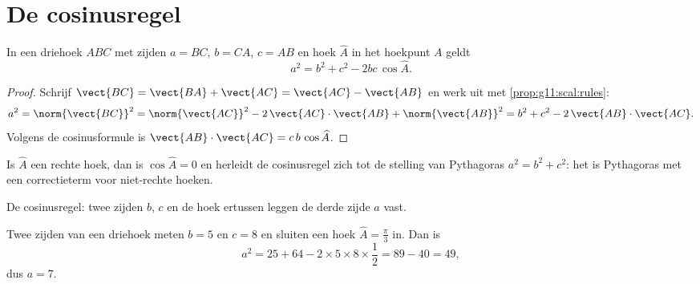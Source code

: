 \section{De cosinusregel}

\begin{theorem}[Cosinusregel]\label{thm:g11:scal:cosines}
In een driehoek $ABC$ met zijden $a = BC$, $b = CA$, $c = AB$ en hoek
$\widehat A$ in het hoekpunt $A$ geldt
\[
a^2 = b^2 + c^2 - 2bc\,\cos\widehat A .
\]
\end{theorem}

\begin{proof}
Schrijf $\vect{BC} = \vect{BA} + \vect{AC} = \vect{AC} - \vect{AB}$ en werk
uit met \cref{prop:g11:scal:rules}:
\[
a^2 = \norm{\vect{BC}}^2
= \norm{\vect{AC}}^2 - 2\,\vect{AC}\cdot\vect{AB} + \norm{\vect{AB}}^2
= b^2 + c^2 - 2\,\vect{AB}\cdot\vect{AC}.
\]
Volgens de cosinusformule is $\vect{AB}\cdot\vect{AC} = c\,b\,\cos\widehat A$.
\end{proof}

\begin{remark}
Is $\widehat A$ een rechte hoek, dan is $\cos\widehat A = 0$ en herleidt de
cosinusregel zich tot de stelling van Pythagoras $a^2 = b^2 + c^2$: het is
Pythagoras met een correctieterm voor niet-rechte hoeken.
\end{remark}

\begin{omfigure}

{\small De cosinusregel: twee zijden $b$, $c$ en de hoek ertussen leggen de
derde zijde $a$ vast.}
\end{omfigure}

\begin{example}\label{ex:g11:scal:cosines}
Twee zijden van een driehoek meten $b = 5$ en $c = 8$ en sluiten een hoek
$\widehat A = \frac\pi3$ in. Dan is
\[
a^2 = 25 + 64 - 2 \times 5 \times 8 \times \frac12 = 89 - 40 = 49,
\]
dus $a = 7$.
\end{example}

